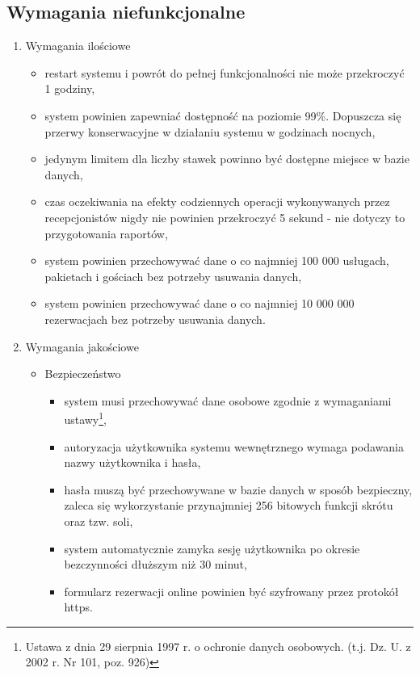 \documentclass[a4paper,onecolumn,oneside,11pt,wide,floatssmall]{mwrep}
\theoremstyle{definition}
\theoremstyle{plain}%
\theoremstyle{remark}
\begin{document}
\subsection{Wymagania niefunkcjonalne}

\begin{enumerate}
  \item Wymagania ilościowe
    \begin{itemize}
      \item restart systemu i powrót do pełnej funkcjonalności nie może przekroczyć 1 godziny,
      \item system powinien zapewniać dostępność na poziomie 99\%. Dopuszcza się przerwy konserwacyjne w działaniu 
      systemu w godzinach nocnych,
      \item jedynym limitem dla liczby stawek powinno być dostępne miejsce w bazie danych,
      \item czas oczekiwania na efekty codziennych operacji wykonywanych przez recepcjonistów nigdy nie powinien 
      przekroczyć 5 sekund - nie dotyczy to przygotowania raportów,
      \item system powinien przechowywać dane o co najmniej 100 000 usługach, pakietach i gościach bez potrzeby 
      usuwania danych,
      \item system powinien przechowywać dane o co najmniej 10 000 000 rezerwacjach bez potrzeby usuwania danych.
    \end{itemize}
  \item Wymagania jakościowe
    \begin{itemize}
      \item Bezpieczeństwo
        \begin{itemize}
          \item system musi przechowywać dane osobowe zgodnie z wymaganiami ustawy\footnote{Ustawa z dnia 29 sierpnia 
          1997 r. o ochronie danych osobowych. (t.j. Dz. U. z 2002 r. Nr 101, poz. 926)},
          \item autoryzacja użytkownika systemu wewnętrznego wymaga podawania nazwy użytkownika i hasła,
          \item hasła muszą być przechowywane w bazie danych w sposób bezpieczny, zaleca się wykorzystanie 
          przynajmniej 256 bitowych funkcji skrótu oraz tzw. soli,
          \item system automatycznie zamyka sesję użytkownika po okresie bezczynności dłuższym niż 30 minut,
          \item formularz rezerwacji online powinien być szyfrowany przez protokół https.

\end{itemize}
\end{itemize}
\end{enumerate}
\end{document}
